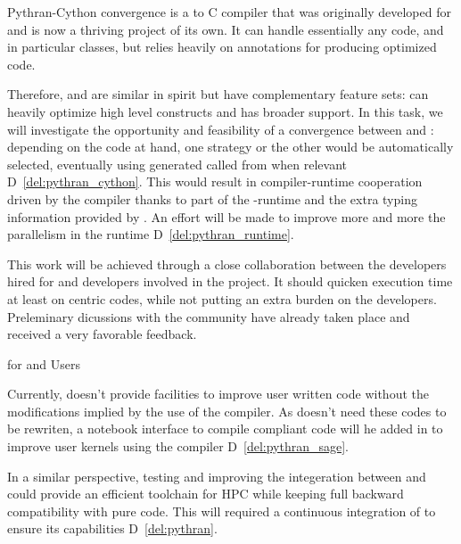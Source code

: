 \begin{Workpackage}{\thewpno}
\begin{task}{Pythran-Cython convergence}
  \Cython is a \Python to C compiler that was originally developed for
  \Sage and is now a thriving project of its own. It can handle
  essentially any \Python code, and in particular classes, but relies
  heavily on annotations for producing optimized code.

  Therefore, \Pythran and \Cython are similar in spirit but have
  complementary feature sets: \Pythran can heavily optimize high level
  \Numpy constructs and \Cython has broader \Python support. In this
  task, we will investigate the opportunity and feasibility of a
  convergence between \Cython and \Pythran: depending on the code at
  hand, one strategy or the other would be automatically selected,
  eventually using \Pythran generated called from \Cython when
  relevant D~\ref{del:pythran_cython}. This would result in compiler-runtime
  cooperation driven by the \Cython compiler thanks to part of the
  \Pythran-runtime and the extra typing information provided by \Cython. An
  effort will be made to improve more and more the parallelism in the
  \Pythran runtime D~\ref{del:pythran_runtime}.

  This work will be achieved through a close collaboration between the \Pythran
  developers hired for \TheProject and \Cython developers involved in the \Sage
  project. It should quicken \Sage execution time at least on \Numpy centric
  codes, while not putting an extra burden on the developers.  Preleminary
  dicussions with the \Cython community have already taken place and received a
  very favorable feedback.


\end{task}

\begin{task}{\Pythran for \Sage and \Sage Users}
  \label{task:pythran_sage}

  Currently, \Sage doesn't provide facilities to improve user written
  \Python code without the modifications implied by the use of the \Cython
  compiler. As \Pythran doesn't need these codes to be rewriten, a notebook
  interface to compile \Pythran compliant code will he added in \Sage to
  improve user kernels using the \Pythran compiler D~\ref{del:pythran_sage}.

  In a similar perspective, testing and improving the integeration between
   and \Pythran could provide an efficient toolchain for HPC
  while keeping full backward compatibility with pure \Python code. This will
  required a continuous integration of \Pythran to ensure its capabilities
  D~\ref{del:pythran}.


\end{task}
\end{Workpackage}
